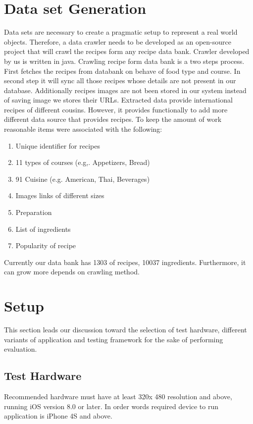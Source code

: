 \section{Data set Generation}
Data sets are necessary to create a pragmatic setup to represent a real world objects. Therefore, a data crawler needs to be developed as an open-source project that will crawl the recipes form any recipe data bank. Crawler developed by us is written in java.  Crawling recipe form data bank is a two steps process.  First fetches the recipes from databank on behave of food type and course.  In second step it will sync all those recipes whose details are not present in our database. Additionally recipes images are not been stored in our system instead of saving image we stores their URLs. Extracted data provide international recipes of different cousins. However, it provides functionally to add more different data source that provides recipes. To keep the amount of work reasonable items were associated with the following:
\begin{enumerate}
	\item Unique identifier for recipes
	\item 11 types of courses (e.g,. Appetizers, Bread)
	\item 91 Cuisine (e.g. American, Thai, Beverages)
	\item Images links of different sizes
	\item Preparation
	\item List of ingredients
	\item Popularity of recipe
\end{enumerate}
Currently our data bank has 1303 of recipes, 10037 ingredients. Furthermore, it can grow more depends on crawling method.
\section{Setup}
This section leads our discussion toward the selection of test hardware, different variants of application and testing framework for the sake of performing evaluation.
\subsection{Test Hardware}
Recommended hardware must have at least 320x 480 resolution and above, running iOS version 8.0 or later. In order words required device to run application is iPhone 4S and above.  
